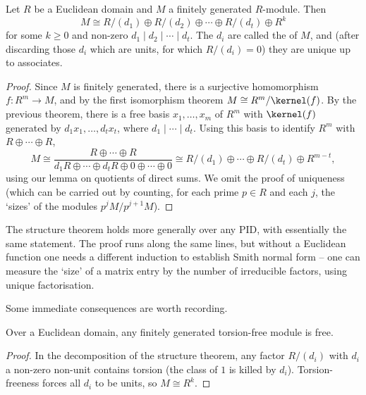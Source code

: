 \begin{theorem}
	Let $R$ be a Euclidean domain and $M$ a finitely generated $R$-module. Then
	$$
	M \cong R/(d_1) \oplus R/(d_2) \oplus \cdots \oplus R/(d_t) \oplus R^k
	$$
	for some $k \geq 0$ and non-zero $d_1 \mid d_2 \mid \cdots \mid d_t$. The $d_i$ are called the  of $M$, and (after discarding those $d_i$ which are units, for which $R/(d_i) = 0$) they are unique up to associates.
\end{theorem}
\begin{proof}
	Since $M$ is finitely generated, there is a surjective homomorphism $f: R^m \rightarrow M$, and by the first isomorphism theorem $M \cong R^m/\kernel(f)$. By the previous theorem, there is a free basis $x_1, \dots, x_m$ of $R^m$ with $\kernel(f)$ generated by $d_1 x_1, \dots, d_t x_t$, where $d_1 \mid \cdots \mid d_t$. Using this basis to identify $R^m$ with $R \oplus \cdots \oplus R$,
	$$
	M \cong \frac{R \oplus \cdots \oplus R}{d_1 R \oplus \cdots \oplus d_t R \oplus 0 \oplus \cdots \oplus 0} \cong R/(d_1) \oplus \cdots \oplus R/(d_t) \oplus R^{m - t},
	$$
	using our lemma on quotients of direct sums. We omit the proof of uniqueness (which can be carried out by counting, for each prime $p \in R$ and each $j$, the `sizes' of the modules $p^j M / p^{j+1}M$).
\end{proof}

\begin{remark}
	The structure theorem holds more generally over any PID, with essentially the same statement. The proof runs along the same lines, but without a Euclidean function one needs a different induction to establish Smith normal form -- one can measure the `size' of a matrix entry by the number of irreducible factors, using unique factorisation.
\end{remark}

Some immediate consequences are worth recording.

\begin{corollary}
	Over a Euclidean domain, any finitely generated torsion-free module is free.
\end{corollary}
\begin{proof}
	In the decomposition of the structure theorem, any factor $R/(d_i)$ with $d_i$ a non-zero non-unit contains torsion (the class of $1$ is killed by $d_i$). Torsion-freeness forces all $d_i$ to be units, so $M \cong R^k$.
\end{proof}

